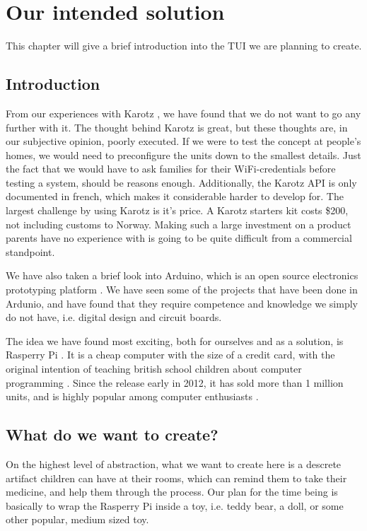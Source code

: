 
\chapter{Our intended solution}
\label{chp:our-solution}

This chapter will give a brief introduction into the TUI we are planning to create. 

\section{Introduction}
\label{sec:our-solution-introduction}
From our experiences with Karotz \cite{karotz}, we have found that we do not want to go any further with it. The thought behind Karotz is great, but these thoughts are, in our subjective opinion, poorly executed. If we were to test the concept at people's homes, we would need to preconfigure the units down to the smallest details. Just the fact that we would have to ask families for their WiFi-credentials before testing a system, should be reasons enough.
Additionally, the Karotz API is only documented in french, which makes it considerable harder to develop for. The largest challenge by using Karotz is it's price. A Karotz starters kit costs \$200, not including customs to Norway. Making such a large investment on a product parents have no experience with is going to be quite difficult from a commercial standpoint.  



We have also taken a brief look into Arduino, which is an open source electronics prototyping platform \cite{arduino}. We have seen some of the projects that have been done in Ardunio, and have found that they require competence and knowledge we simply do not have, i.e. digital design and circuit boards. 


The idea we have found most exciting, both for ourselves and as a solution, is Rasperry Pi \cite{rasperrypi}. It is a cheap computer with the size of a credit card, with the original intention of teaching british school children about computer programming \cite{rasperrypi-about}. Since the release early in 2012, it has sold more than 1 million units, and is highly popular among computer enthusiasts \cite{pimillion}. 


\section{What do we want to create?}
On the highest level of abstraction, what we want to create here is a descrete artifact children can have at their rooms, which can remind them to take their medicine, and help them through the process. Our plan for the time being is basically to wrap the Rasperry Pi inside a toy, i.e. teddy bear, a doll, or some other popular, medium sized toy.

